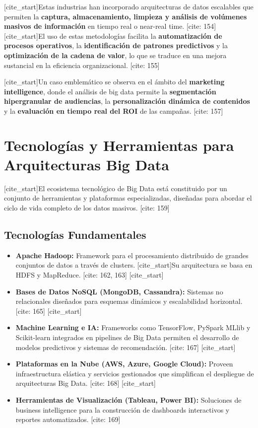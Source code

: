\documentclass[12pt, a4paper]{article}
\begin{document}
[cite_start]Estas industrias han incorporado arquitecturas de datos escalables que permiten la \textbf{captura, almacenamiento, limpieza y análisis de volúmenes masivos de información} en tiempo real o near-real time. [cite: 154] [cite_start]El uso de estas metodologías facilita la \textbf{automatización de procesos operativos}, la \textbf{identificación de patrones predictivos} y la \textbf{optimización de la cadena de valor}, lo que se traduce en una mejora sustancial en la eficiencia organizacional. [cite: 155]

[cite_start]Un caso emblemático se observa en el ámbito del \textbf{marketing intelligence}, donde el análisis de big data permite la \textbf{segmentación hipergranular de audiencias}, la \textbf{personalización dinámica de contenidos} y la \textbf{evaluación en tiempo real del ROI} de las campañas. [cite: 157]

\section{Tecnologías y Herramientas para Arquitecturas Big Data}
[cite_start]El ecosistema tecnológico de Big Data está constituido por un conjunto de herramientas y plataformas especializadas, diseñadas para abordar el ciclo de vida completo de los datos masivos. [cite: 159]

\subsection{Tecnologías Fundamentales}
\begin{itemize}
    \item \textbf{Apache Hadoop:} Framework para el procesamiento distribuido de grandes conjuntos de datos a través de clusters. [cite_start]Su arquitectura se basa en HDFS y MapReduce. [cite: 162, 163]
    [cite_start]\item \textbf{Bases de Datos NoSQL (MongoDB, Cassandra):} Sistemas no relacionales diseñados para esquemas dinámicos y escalabilidad horizontal. [cite: 165]
    [cite_start]\item \textbf{Machine Learning e IA:} Frameworks como TensorFlow, PySpark MLlib y Scikit-learn integrados en pipelines de Big Data permiten el desarrollo de modelos predictivos y sistemas de recomendación. [cite: 167]
    [cite_start]\item \textbf{Plataformas en la Nube (AWS, Azure, Google Cloud):} Proveen infraestructura elástica y servicios gestionados que simplifican el despliegue de arquitecturas Big Data. [cite: 168]
    [cite_start]\item \textbf{Herramientas de Visualización (Tableau, Power BI):} Soluciones de business intelligence para la construcción de dashboards interactivos y reportes automatizados. [cite: 169]
\end{itemize}
\end{document}
